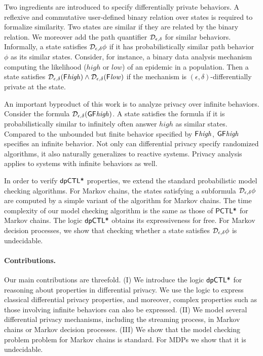 
Two ingredients are introduced to specify differentially private
behaviors. A reflexive and commutative user-defined binary relation
over states is required to formalize similarity. Two states are
similar if they are related by the binary relation. We moreover add
the path quantifier $\mathcal{D}_{{\epsilon}, {\delta}}$ for similar
behaviors. Informally, a state satisfies $\mathcal{D}_{{\epsilon}, {\delta}}
\phi$ if it has probabilistically similar path behavior $\phi$ as
its similar states. Consider, for instance, a binary data analysis
mechanism computing the likelihood ($\mathit{high}$ or $\mathit{low}$)
of an epidemic in a population. Then a state satisfies
$\mathcal{D}_{{\epsilon}, {\delta}} (\mathsf{F} \mathit{high}) \wedge
\mathcal{D}_{{\epsilon}, {\delta}} (\mathsf{F} \mathit{low})$ if the mechanism is
$(\epsilon, \delta)$-differentially private at the state.


An important byproduct of this work is to analyze privacy over
infinite behaviors. Consider the formula $\mathcal{D}_{{\epsilon}, {\delta}}
(\mathsf{G} \mathsf{F} \mathit{high})$. A state satisfies the formula if it
is probabilistically similar to  infinitely often
answer $\mathit{high}$ as similar states. Compared to the unbounded
but finite behavior specified by $\mathsf{F} \mathit{high}$,
$\mathsf{G} \mathsf{F} \mathit{high}$ specifies an infinite behavior.
Not only can differential privacy specify randomized algorithms, it
also naturally generalizes to reactive systems.
Privacy analysis applies to systems with infinite behaviors as well.


In order to verify $\textsf{dpCTL*}$ properties, we extend the standard
probabilistic model checking algorithms. For Markov chains, the states
satisfying a subformula $\mathcal{D}_{{\epsilon}, {\delta}} \phi$ are computed
by a simple variant of the algorithm for Markov chains.
The time complexity of our model checking algorithm is the same as
those of $\textsf{PCTL*}$ for Markov chains. The logic $\textsf{dpCTL*}$ obtains its
expressiveness for free.
For Markov decision processes, we show that checking whether a state
satisfies $\mathcal{D}_{{\epsilon}, {\delta}} \phi$ is undecidable.


\paragraph{Contributions.} Our main contributions are threefold. (I)
We introduce the logic $\textsf{dpCTL*}$ for reasoning about properties in
differential privacy. We use the logic to express classical
differential privacy properties, and moreover, complex properties such as those
involving infinite behaviors can also be expressed. (II) We model several differential privacy mechanisms, including the streaming process, in Markov chains or Markov decision processes.
(III) We show that the model checking problem
problem for Markov chains is standard. For MDPs we show that it is undecidable.
